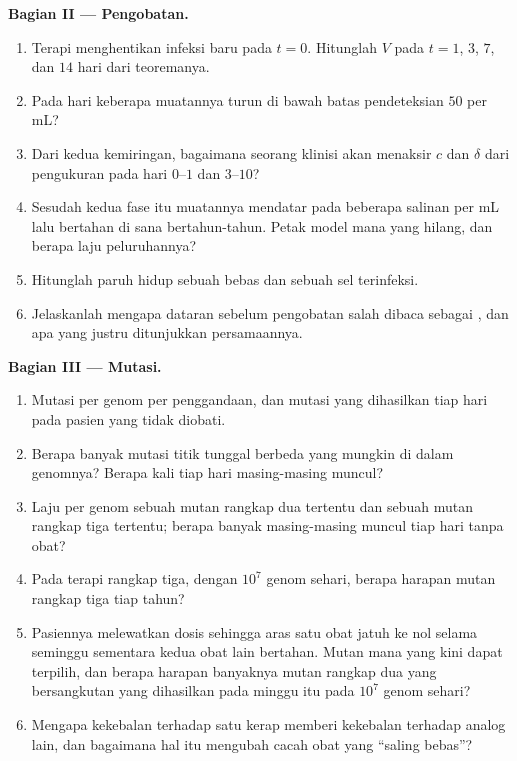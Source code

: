 \begin{problem}
\medskip
\noindent\textbf{Bagian II --- Pengobatan.}
\begin{enumerate}[resume]
  \item Terapi menghentikan infeksi baru pada $t = 0$. Hitunglah $V$ pada $t =
        1$, $3$, $7$, dan $14$ hari dari teoremanya.
  \item Pada hari keberapa muatannya turun di bawah batas pendeteksian
        $50$ per mL?
  \item Dari kedua kemiringan, bagaimana seorang klinisi akan menaksir $c$ dan
        $\delta$ dari pengukuran pada hari $0$--$1$ dan $3$--$10$?
  \item Sesudah kedua fase itu muatannya mendatar pada beberapa salinan per mL
        lalu bertahan di sana bertahun-tahun. Petak model mana yang hilang,
        dan berapa laju peluruhannya?
  \item Hitunglah paruh hidup sebuah  bebas dan sebuah sel terinfeksi.
  \item Jelaskanlah mengapa dataran sebelum pengobatan salah dibaca sebagai
        , dan apa yang justru ditunjukkan persamaannya.
\end{enumerate}

\medskip
\noindent\textbf{Bagian III --- Mutasi.}
\begin{enumerate}[resume]
  \item Mutasi per genom per penggandaan, dan mutasi yang dihasilkan
        tiap hari pada pasien yang tidak diobati.
  \item Berapa banyak mutasi titik tunggal berbeda yang mungkin di dalam
        genomnya? Berapa kali tiap hari masing-masing muncul?
  \item Laju per genom sebuah mutan rangkap dua tertentu dan sebuah mutan
        rangkap tiga tertentu; berapa banyak masing-masing muncul tiap hari
        tanpa obat?
  \item Pada terapi rangkap tiga, dengan $10^{7}$ genom sehari, berapa harapan
        mutan rangkap tiga tiap tahun?
  \item Pasiennya melewatkan dosis sehingga aras satu obat jatuh ke
        nol selama seminggu sementara kedua obat lain bertahan. Mutan mana yang
        kini dapat terpilih, dan berapa harapan banyaknya
        mutan rangkap dua yang bersangkutan yang dihasilkan pada minggu itu
        pada $10^{7}$ genom sehari?
  \item Mengapa kekebalan terhadap satu  kerap memberi
        kekebalan terhadap analog lain, dan bagaimana hal itu mengubah cacah
        obat yang ``saling bebas''?
\end{enumerate}


\end{problem}
